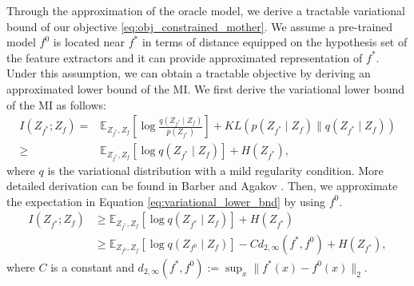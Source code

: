 Through the approximation of the oracle model, we derive a tractable variational bound of our objective \eqref{eq:obj_constrained_mother}.
We assume a pre-trained model $f^{0}$ is located near $f^{*}$ in terms of distance equipped on the hypothesis set of the feature extractors and it can provide approximated representation of $f^{*}$.
Under this assumption, 
we can obtain a tractable objective by deriving an approximated lower bound of the MI.
We first derive the variational lower bound of the MI as follows:
\begin{align}
    I(Z_{f^{*}} ; Z_f)
    =&\mathbb{E}_{Z_{f^{*}}, Z_f}\left[\log \frac{q(Z_{f^{*}} \mid Z_f)}{p(Z_{f^{*}})}\right]+K L(p(Z_{f^{*}}\mid Z_f) \| q(Z_{f^{*}}\mid Z_f)) \nonumber\\
    \geq& \mathbb{E}_{Z_{f^{*}}, Z_f}[\log q(Z_{f^{*}}\mid Z_f)]+H(Z_{f^{*}}),\label{eq:variational_lower_bnd}
\end{align}
where $q$ is the variational distribution with a mild regularity condition.
More detailed derivation can be found in Barber and Agakov \cite{agakov2004vim}.
Then, we approximate the expectation in Equation \eqref{eq:variational_lower_bnd} by using $f^{0}$. 
\begin{align}
    I(Z_{f^{*}} ; Z_f) &\geq \mathbb{E}_{Z_{f^{*}}, Z_f}\left[\log q(Z_{f^{*}} \mid Z_f)\right]+H(Z_{f^{*}})\nonumber\\
    &\geq \mathbb{E}_{Z_{f^{0}},Z_{f}}\left[\log q(Z_{f^{0}} \mid Z_{f})\right] - Cd_{2,\infty}(f^{*}, f^{0})+H(Z_{f^{*}}),\label{eq:distribution_change}
\end{align}
where $C$ is a constant and $d_{2,\infty}(f^{*},f^{0}):=\sup_{x}\|f^{*}(x)-f^{0}(x)\|_{2}$.

